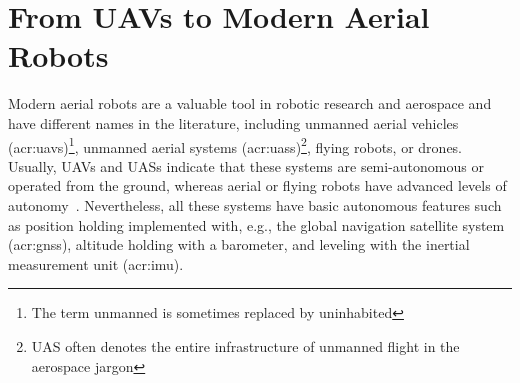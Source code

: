 

\section{From UAVs to Modern Aerial Robots}
\label{sec:history}

Modern aerial robots are a valuable tool in robotic research and aerospace and have different names in the literature, including unmanned aerial vehicles (\Gls{acr:uav}s)\footnote{The term unmanned is sometimes replaced by uninhabited}, unmanned aerial systems (\Gls{acr:uas}s)\footnote{UAS often denotes the entire infrastructure of unmanned flight in the aerospace jargon}, flying robots, or drones. Usually, UAVs and UASs indicate that these systems are semi-autonomous or operated from the ground, whereas aerial or flying robots have advanced levels of autonomy~\citep{siciliano2016springer}. Nevertheless, all these systems have basic autonomous features such as position holding implemented with, e.g., the global navigation satellite system (\Gls{acr:gnss}), altitude holding with a barometer, and leveling with the inertial measurement unit (\Gls{acr:imu}).

